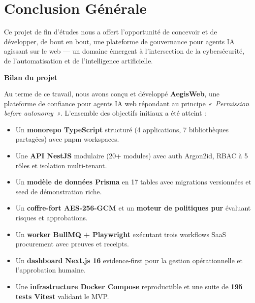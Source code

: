 \clearpage
\chapter*{Conclusion Générale}

\begin{chapintro}
Ce projet de fin d'études nous a offert l'opportunité de concevoir et
de développer, de bout en bout, une plateforme de gouvernance pour agents
IA agissant sur le web — un domaine émergent à l'intersection de la
cybersécurité, de l'automatisation et de l'intelligence artificielle.
\end{chapintro}

\medskip
\noindent\textbf{\large Bilan du projet}

\medskip
Au terme de ce travail, nous avons conçu et développé \textbf{AegisWeb},
une plateforme de confiance pour agents IA web répondant au principe
\textit{«~Permission before autonomy~»}. L'ensemble des objectifs initiaux
a été atteint :

\begin{itemize}[leftmargin=1.8cm, itemsep=4pt]
  \item Un \textbf{monorepo TypeScript} structuré (4 applications, 7
    bibliothèques partagées) avec pnpm workspaces.
  \item Une \textbf{API NestJS} modulaire (20+ modules) avec auth Argon2id,
    RBAC à 5 rôles et isolation multi-tenant.
  \item Un \textbf{modèle de données Prisma} en 17 tables avec migrations
    versionnées et seed de démonstration riche.
  \item Un \textbf{coffre-fort AES-256-GCM} et un \textbf{moteur de
    politiques pur} évaluant risques et approbations.
  \item Un \textbf{worker BullMQ + Playwright} exécutant trois workflows
    SaaS procurement avec preuves et receipts.
  \item Un \textbf{dashboard Next.js 16} evidence-first pour la gestion
    opérationnelle et l'approbation humaine.
  \item Une \textbf{infrastructure Docker Compose} reproductible et une
    suite de \textbf{195 tests Vitest} validant le MVP.
\end{itemize}

